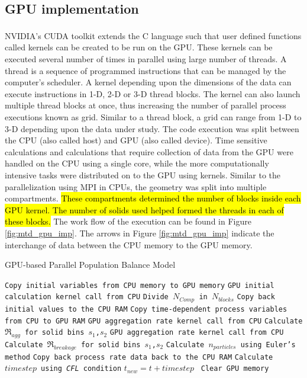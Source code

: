 \documentclass[review]{elsarticle}
\begin{document}
\begin{linenumbers}
\subsection{GPU implementation}
NVIDIA\textsuperscript{\tiny\textregistered}’s CUDA\textsuperscript{\tiny\textregistered} 
toolkit extends the C language such that user defined functions 
called kernels can be created to be run on the GPU. These kernels can be 
executed several number of times in parallel using large number of threads. 
A thread is a sequence of programmed instructions that can be managed by the 
computer’s scheduler. A kernel depending upon the dimensions of the data can execute 
instructions in 1-D, 2-D or 3-D thread blocks. The kernel can also launch 
multiple thread blocks at once, thus increasing the number of parallel 
process executions known as grid. Similar to a thread block, a grid can 
range from 1-D to 3-D depending upon the data under study.
The code execution was split between the CPU (also called host) and GPU 
(also called device). Time sensitive calculations and calculations that
require collection of data from the GPU were handled on the CPU 
using a single core, while the more computationally intensive tasks were distributed 
on to the GPU using kernels. Similar to the parallelization using MPI in CPUs, the 
geometry was split into multiple compartments. \hl{These compartments determined the number of 
blocks inside each GPU kernel. The number of solids used helped formed 
the threads in each of these blocks.} The work flow of the execution can 
be found in Figure \ref{fig:mtd_gpu_imp}. The arrows in Figure \ref{fig:mtd_gpu_imp} 
indicate the interchange of data between the CPU memory to the GPU memory. 




\begin{algorithm}
     \scriptsize
     \caption{GPU-based Parallel Population Balance Model}
     \label{alg:GPUparallelPBM}
     \begin{algorithmic}[1]
     \State\texttt{Copy initial variables from CPU memory to GPU memory}
     \State \texttt{GPU initial calculation kernel call from CPU}
     \State \texttt{Divide $N_{Comp}$ in $N_{blocks}$}
     \State \texttt{Copy back initial values to the CPU RAM}
	 \State \texttt{Copy time-dependent process variables from CPU to GPU RAM}
     \State \texttt{GPU aggregation rate kernel call from CPU}
     \State \texttt{Calculate $\Re_{agg}$ for solid bins $s_1$,$s_2$}
	 \State \texttt{GPU aggregation rate kernel call from CPU}     
     \State \texttt{Calculate $\Re_{breakage}$ for solid bins $s_1$,$s_2$}
     \State \texttt{Calculate $n_{particles}$ using Euler's method}
     \State \texttt{Copy back process rate data back to the CPU RAM}
     \State \texttt{Calculate $timestep$ using \textit{CFL} condition}
     \State \texttt{$t_{new} = t + timestep$ }
     \EndWhile
     \State \texttt{Clear GPU memory}
     \EndProcedure
     \end{algorithmic}
 \end{algorithm}


\end{linenumbers}
\end{document}
